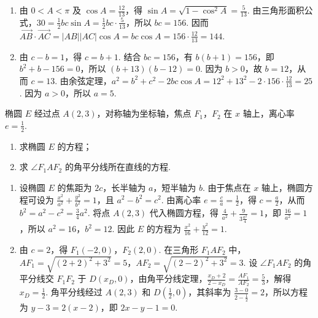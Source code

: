 \begin{solution}
\begin{enumerate}
\item 由 \(0<A<\pi\) 及 \(\cos A=\frac{12}{13}\)，得 \(\sin A=\sqrt{1-\cos^2 A}=\frac{5}{13}\). 由三角形面积公式，\(30=\frac12bc\sin A=\frac12bc\cdot\frac5{13}\)，所以 \(bc=156\). 因而 \(\overrightarrow{AB}\cdot\overrightarrow{AC}=|AB||AC|\cos A=bc\cos A=156\cdot\frac{12}{13}=144\).
\item 由 \(c-b=1\)，得 \(c=b+1\). 结合 \(bc=156\)，有 \(b(b+1)=156\)，即 \(b^2+b-156=0\)，所以 \((b+13)(b-12)=0\). 因为 \(b>0\)，故 \(b=12\)，从而 \(c=13\). 由余弦定理，\(a^2=b^2+c^2-2bc\cos A=12^2+13^2-2\cdot156\cdot\frac{12}{13}=25\). 因为 \(a>0\)，所以 \(a=5\).
\end{enumerate}
\end{solution}

\begin{problem}
椭圆 \(E\) 经过点 \(A(2,3)\)，对称轴为坐标轴，焦点 \(F_{1}\)，\(F_{2}\) 在 \(x\) 轴上，离心率 \(e = \frac{1}{2}\).

\begin{enumerate}
\item 求椭圆 \(E\) 的方程；
\item 求 \(\angle F_{1}AF_{2}\) 的角平分线所在直线的方程.
\end{enumerate}

\end{problem}

\begin{solution}
\begin{enumerate}
\item 设椭圆 \(E\) 的焦距为 \(2c\)，长半轴为 \(a\)，短半轴为 \(b\). 由于焦点在 \(x\) 轴上，椭圆方程可设为 \(\frac{x^2}{a^2}+\frac{y^2}{b^2}=1\)，且 \(a^2-b^2=c^2\). 由离心率 \(e=\frac ca=\frac12\)，得 \(c=\frac a2\)，从而 \(b^2=a^2-c^2=\frac34a^2\). 将点 \(A(2,3)\) 代入椭圆方程，得 \(\frac4{a^2}+\frac9{3\frac{a^2}{4}}=1\)，即 \(\frac{16}{a^2}=1\)，所以 \(a^2=16\)，\(b^2=12\). 因此 \(E\) 的方程为 \(\frac{x^2}{16}+\frac{y^2}{12}=1\).
\item 由 \(c=2\)，得 \(F_1(-2,0)\)，\(F_2(2,0)\). 在三角形 \(F_1AF_2\) 中，\(AF_1=\sqrt{(2+2)^2+3^2}=5\)，\(AF_2=\sqrt{(2-2)^2+3^2}=3\). 设 \(\angle F_1AF_2\) 的角平分线交 \(F_1F_2\) 于 \(D(x_D,0)\)，由角平分线定理，\(\frac{x_D+2}{2-x_D}=\frac{AF_1}{AF_2}=\frac53\)，解得 \(x_D=\frac12\). 角平分线经过 \(A(2,3)\) 和 \(D\left(\frac12,0\right)\)，其斜率为 \(\frac{3-0}{2-\frac12}=2\)，所以方程为 \(y-3=2(x-2)\)，即 \(2x-y-1=0\).
\end{enumerate}
\end{solution}


